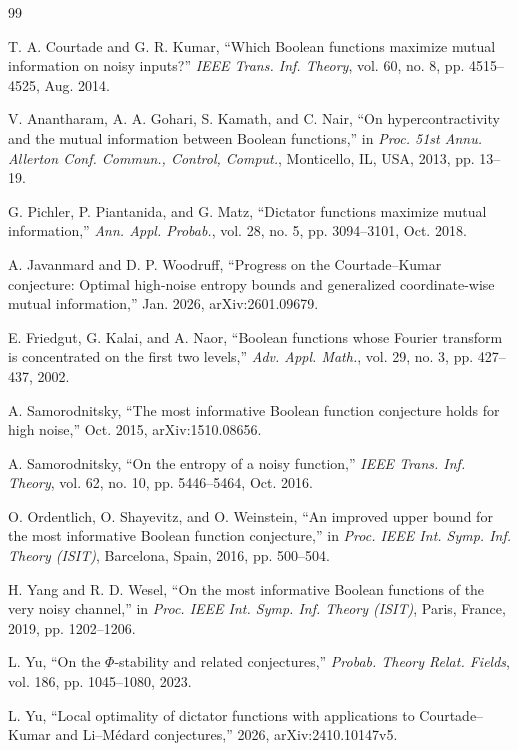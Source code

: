 \begin{thebibliography}{99}

T. A. Courtade and G. R. Kumar, ``Which Boolean functions maximize
mutual information on noisy inputs?'' \emph{IEEE Trans. Inf. Theory},
vol. 60, no. 8, pp. 4515--4525, Aug. 2014.

V. Anantharam, A. A. Gohari, S. Kamath, and C. Nair, ``On
hypercontractivity and the mutual information between Boolean
functions,'' in \emph{Proc. 51st Annu. Allerton Conf. Commun., Control,
Comput.}, Monticello, IL, USA, 2013, pp. 13--19.

G. Pichler, P. Piantanida, and G. Matz, ``Dictator functions maximize
mutual information,'' \emph{Ann. Appl. Probab.}, vol. 28, no. 5,
pp. 3094--3101, Oct. 2018.

A. Javanmard and D. P. Woodruff, ``Progress on the Courtade--Kumar
conjecture: Optimal high-noise entropy bounds and generalized
coordinate-wise mutual information,'' Jan. 2026, arXiv:2601.09679.

E. Friedgut, G. Kalai, and A. Naor, ``Boolean functions whose Fourier
transform is concentrated on the first two levels,'' \emph{Adv. Appl.
Math.}, vol. 29, no. 3, pp. 427--437, 2002.

A. Samorodnitsky, ``The most informative Boolean function conjecture
holds for high noise,'' Oct. 2015, arXiv:1510.08656.

A. Samorodnitsky, ``On the entropy of a noisy function,'' \emph{IEEE
Trans. Inf. Theory}, vol. 62, no. 10, pp. 5446--5464, Oct. 2016.

O. Ordentlich, O. Shayevitz, and O. Weinstein, ``An improved upper bound
for the most informative Boolean function conjecture,'' in \emph{Proc.
IEEE Int. Symp. Inf. Theory (ISIT)}, Barcelona, Spain, 2016, pp. 500--504.

H. Yang and R. D. Wesel, ``On the most informative Boolean functions of
the very noisy channel,'' in \emph{Proc. IEEE Int. Symp. Inf. Theory
(ISIT)}, Paris, France, 2019, pp. 1202--1206.

L. Yu, ``On the $\Phi$-stability and related conjectures,'' \emph{Probab.
Theory Relat. Fields}, vol. 186, pp. 1045--1080, 2023.

L. Yu, ``Local optimality of dictator functions with applications to
Courtade--Kumar and Li--M\'edard conjectures,'' 2026,
arXiv:2410.10147v5.


\end{thebibliography}
